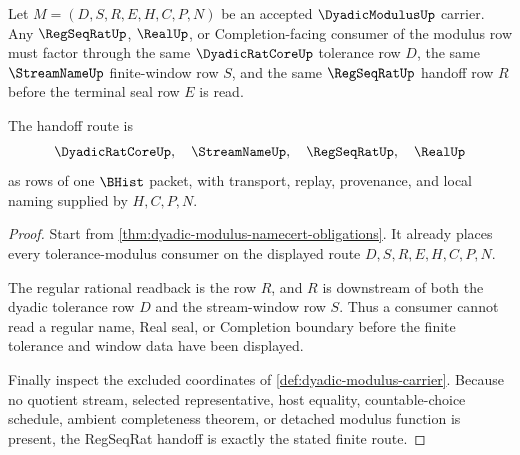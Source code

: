 \begin{theorem}
\label{thm:dyadic-modulus-regseqrat-handoff}
Let $M=(D,S,R,E,H,C,P,N)$ be an accepted $\DyadicModulusUp$ carrier. Any $\RegSeqRatUp$, $\RealUp$, or Completion-facing consumer of the modulus row must factor through the same $\DyadicRatCoreUp$ tolerance row $D$, the same $\StreamNameUp$ finite-window row $S$, and the same $\RegSeqRatUp$ handoff row $R$ before the terminal seal row $E$ is read.

The handoff route is
$$
\DyadicRatCoreUp,\quad
\StreamNameUp,\quad
\RegSeqRatUp,\quad
\RealUp
$$
as rows of one $\BHist$ packet, with transport, replay, provenance, and local naming supplied by $H,C,P,N$.
\end{theorem}
\begin{proof}
Start from \autoref{thm:dyadic-modulus-namecert-obligations}. It already places every tolerance-modulus consumer on the displayed route $D,S,R,E,H,C,P,N$.

The regular rational readback is the row $R$, and $R$ is downstream of both the dyadic tolerance row $D$ and the stream-window row $S$. Thus a consumer cannot read a regular name, Real seal, or Completion boundary before the finite tolerance and window data have been displayed.

Finally inspect the excluded coordinates of \autoref{def:dyadic-modulus-carrier}. Because no quotient stream, selected representative, host equality, countable-choice schedule, ambient completeness theorem, or detached modulus function is present, the RegSeqRat handoff is exactly the stated finite route.
\end{proof}




